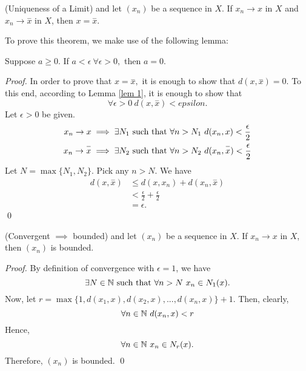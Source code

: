     \begin{theorem}(Uniqueness of a Limit)
        \routineMS and let $(x_n)$ be a sequence in $X$. If $x_n \to x$ in $X$ and $x_n \to \overset{-}{x}$ in $X$, then $x = \overset{-}{x}$.
    \end{theorem}
     To prove this theorem, we make use of the following lemma:
     \begin{lemma}
        \label{lem 1}
        Suppose $a \geq 0.$ If $a < \epsilon ~\forall \epsilon > 0,$ then $a=0$.
     \end{lemma}
     \begin{proof}
        In order to prove that $x = \overset{-}{x},$ it is enough to show that $d(x, \overset{-}{x}) = 0.$ To this end, according to Lemma \ref{lem 1}, it is enough to show that
        $$\forall \epsilon > 0 ~ d(x, \overset{-}{x}) < epsilon.$$
        Let $\epsilon > 0$ be given.
        \begin{align*}
            x_n \to x &\implies \exists N_1 \text{ such that } \forall n > N_1 ~d(x_n, x) < \frac{\epsilon}{2} \\
            x_n \to \overset{-}{x} &\implies \exists N_2 \text{ such that } \forall n > N_2 ~d(x_n, \overset{-}{x}) < \frac{\epsilon}{2}
        \end{align*}
        Let $N= \max\{N_1, N_2\}$. Pick any $n > N$. We have
        \begin{align*}
            d(x, \overset{-}{x}) &\leq d(x, x_n) + d(x_n, \overset{-}{x}) \\
            &< \frac{\epsilon}{2} + \frac{\epsilon}{2} \\
            &= \epsilon.
        \end{align*}
        \qed
     \end{proof}

     \begin{theorem}(Convergent $\implies$ bounded)
        \routineMS and let $(x_n)$ be a sequence in $X$. If $x_n \to x$ in $X$, then $(x_n)$ is bounded.
     \end{theorem}
     \begin{proof}
        By definition of convergence with $\epsilon = 1$, we have
        $$\exists N \in \mathbb{N} \text{ such that } \forall n > N ~x_n \in N_1(x).$$
        Now, let $r= \max \{1, d(x_1, x), d(x_2, x), ..., d(x_n, x)\} + 1$.
        Then, clearly,
        $$\forall n \in \mathbb{N} ~d(x_n, x) < r$$
        Hence,
        $$ \forall n \in \mathbb{N} ~x_n \in N_r(x).$$
        Therefore, $(x_n)$ is bounded. \qed
     \end{proof}


